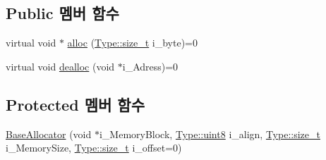 \subsection*{Public 멤버 함수}
\begin{DoxyCompactItemize}
\item 
virtual void $\ast$ \hyperlink{class_comet_engine_1_1_core_1_1_memory_1_1_base_allocator_a8f51b4daa12e31477f57003494c09098}{alloc} (\hyperlink{namespace_comet_engine_1_1_type_a7c94ea6f8948649f8d181ae55911eeaf}{Type\+::size\+\_\+t} i\+\_\+byte)=0
\item 
virtual void \hyperlink{class_comet_engine_1_1_core_1_1_memory_1_1_base_allocator_acca0d1592319cfecb53f8333033a644b}{dealloc} (void $\ast$i\+\_\+\+Adress)=0
\end{DoxyCompactItemize}
\subsection*{Protected 멤버 함수}
\begin{DoxyCompactItemize}
\item 
\hyperlink{class_comet_engine_1_1_core_1_1_memory_1_1_base_allocator_a389c24863a5abee333f325634c18bea3}{Base\+Allocator} (void $\ast$i\+\_\+\+Memory\+Block, \hyperlink{namespace_comet_engine_1_1_type_a1b09856a6463f2bcc4bd8ff0e4e3ee0f}{Type\+::uint8} i\+\_\+align, \hyperlink{namespace_comet_engine_1_1_type_a7c94ea6f8948649f8d181ae55911eeaf}{Type\+::size\+\_\+t} i\+\_\+\+Memory\+Size, \hyperlink{namespace_comet_engine_1_1_type_a7c94ea6f8948649f8d181ae55911eeaf}{Type\+::size\+\_\+t} i\+\_\+offset=0)
\end{DoxyCompactItemize}
